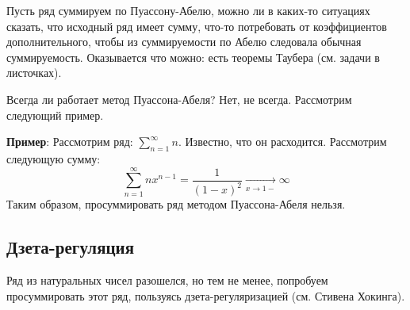 \documentclass[12pt]{article}
\theoremstyle{definition}
\newcommand{\ddsum}[2]{\displaystyle\sum\limits_{#1}^{#2}}
\begin{document}
Пусть ряд суммируем по Пуассону-Абелю, можно ли в каких-то ситуациях сказать, что исходный ряд имеет сумму, что-то потребовать от коэффициентов дополнительного, чтобы из суммируемости по Абелю следовала обычная суммируемость. Оказывается что можно: есть теоремы Таубера (см. задачи в листочках).

Всегда ли работает метод Пуассона-Абеля? Нет, не всегда. Рассмотрим следующий пример.

\textbf{Пример}: Рассмотрим ряд: $\ddsum{n = 1}{\infty}n$. Известно, что он расходится. Рассмотрим следующую сумму:
$$
	\ddsum{n = 1}{\infty}nx^{n-1} = \dfrac{1}{(1 - x)^2}\xrightarrow[x \to 1-]{} \infty
$$
Таким образом, просуммировать ряд методом Пуассона-Абеля нельзя. 

\subsection*{Дзета-регуляция}
Ряд из натуральных чисел разошелся, но тем не менее, попробуем просуммировать этот ряд, пользуясь дзета-регуляризацией (см. Стивена Хокинга).
\end{document}
